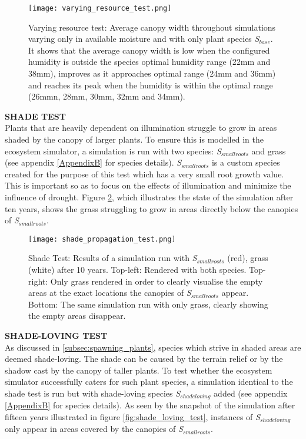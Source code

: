 \begin{figure}
\center
	\texttt{[image: varying\_resource\_test.png]}
	\caption{ Varying resource test: Average canopy width throughout simulations varying only in available moisture and with only plant species \textit{S$_{base}$}. It shows that the average canopy width is low when the configured humidity is outside the species optimal humidity range (22mm and 38mm), improves as it approaches optimal range (24mm and 36mm) and reaches its peak when the humidity is within the optimal range (26mmn, 28mm, 30mm, 32mm and 34mm).}
	\label{fig:varying_resource_test}
\end{figure}

\textbf{SHADE TEST}\\

Plants that are heavily dependent on illumination struggle to grow in areas shaded by the canopy of larger plants. To ensure this is modelled in the ecosystem simulator, a simulation is run with two species: \textit{S$_{smallroots}$} and grass (see appendix \ref{AppendixB} for species details). \textit{S$_{smallroots}$} is a custom species created for the purpose of this test which has a very small root growth value. This is important so as to focus on the effects of illumination and minimize the influence of drought. Figure \ref{fig:shade_test}, which illustrates the state of the simulation after ten years, shows the grass struggling to grow in areas directly below the canopies of \textit{S$_{smallroots}$}.\\

\begin{figure}
\center
	\texttt{[image: shade\_propagation\_test.png]}
	\caption{ Shade Test: Results of a simulation run with \textit{S$_{smallroots}$} (red), grass (white) after 10 years. Top-left: Rendered with both species. Top-right: Only grass rendered in order to clearly visualise the empty areas at the exact locations the canopies of \textit{S$_{smallroots}$} appear. Bottom: The same simulation run with only grass, clearly showing the empty areas disappear.} 
	\label{fig:shade_test}
\end{figure}

\textbf{SHADE-LOVING TEST}\\

As discussed in \ref{subsec:spawning_plants}, species which strive in shaded areas are deemed shade-loving. The shade can be caused by the terrain relief or by the shadow cast by the canopy of taller plants. To test whether the ecosystem simulator successfully caters for such plant species, a simulation identical to the shade test is run but with shade-loving species \textit{S$_{shadeloving}$} added (see appendix \ref{AppendixB} for species details). As seen by the snapshot of the simulation after fifteen years illustrated in figure \ref{fig:shade_loving_test}, instances of \textit{S$_{shadeloving}$} only appear in areas covered by the canopies of \textit{S$_{smallroots}$}.

